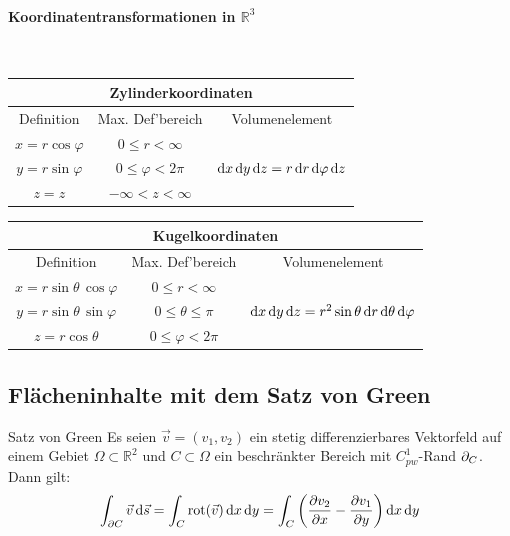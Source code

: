 \documentclass[a4paper,10pt]{article}
\def\R{\mathbb{R}}
\DeclareMathOperator{\rot}{rot}
\begin{document}
\paragraph{Koordinatentransformationen in \texorpdfstring{\( \R^3 \)}{3 Dimensionen}} \
\begin{table}[H]
    \centering
    \footnotesize
    \begin{tabular}{|c|c|c|}
        \hline
        \multicolumn{3}{|c|}{\textbf{Zylinderkoordinaten}} \\
        \hline
        Definition & Max. Def'bereich & Volumenelement \\
        \hline
        \( x = r \cos \varphi\) & \( 0 \leq r < \infty \) & \multirow{3}{*}{\centering \( \odif{x, y, z} = r \odif{r, \varphi, z} \)} \\
        \( y = r \sin \varphi \) & \( 0 \leq \varphi < 2 \pi \) & \\
        \( z = z \) & \( -\infty < z < \infty \) & \\
        \hline
    \end{tabular}
\end{table}
\begin{table}[H]
    \centering
    \footnotesize
    \begin{tabular}{|c|c|c|}
        \hline
        \multicolumn{3}{|c|}{\textbf{Kugelkoordinaten}} \\
        \hline
        Definition & Max. Def'bereich & Volumenelement \\
        \hline
        \( x = r \sin \theta \, \cos \varphi\) & \( 0 \leq r < \infty \) & \multirow{3}{*}{\centering \( \odif{x, y, z} = r^2 \sin \theta \odif{r, \theta, \varphi} \)} \\
        \( y = r \sin \theta \, \sin \varphi \) & \( 0 \leq \theta \leq \pi \) & \\
        \( z = r \cos \theta \) & \( 0 \leq \varphi < 2 \pi \) & \\
        \hline
    \end{tabular}
\end{table}

\subsection{Flächeninhalte mit dem Satz von Green}
\begin{mainbox}{Satz von Green}
    Es seien \( \vec{v} = (v_1, v_2) \) ein stetig differenzierbares Vektorfeld auf einem Gebiet \( \Omega \subset \R^2 \) und \( C \subset \Omega \) ein beschränkter Bereich mit \( C^1_{pw} \)-Rand \( \pdif{C} \).
    Dann gilt:
    \[
        \int_{\partial C} \vec{v} \, \mathrm{d}\vec{s} = \int_C \rot(\vec{v}) \odif{x, y} = \int_C \left( \frac{\partial v_2}{\partial x} - \frac{\partial v_1}{\partial y} \right) \odif{x, y}
    \]
\end{mainbox}
\end{document}

